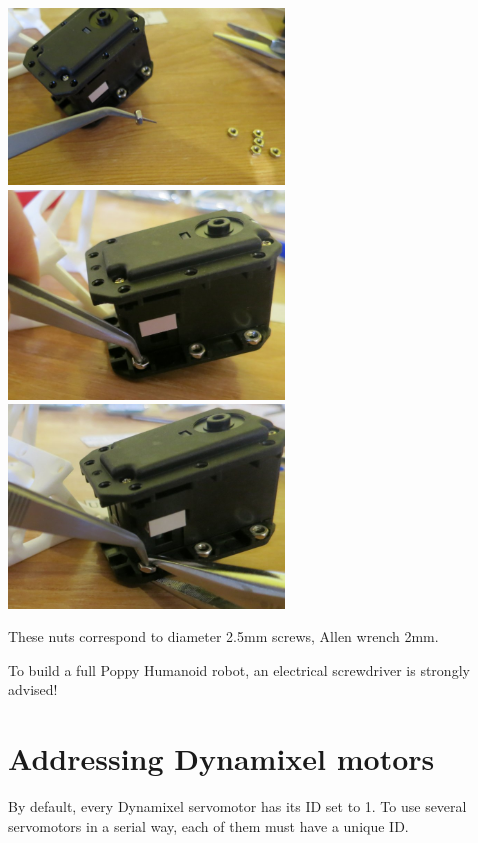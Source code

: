 \documentclass{article}
\begin{document}
 \begin{center}
  \includegraphics[width=0.55\textwidth]{img/nuts1}
  \includegraphics[width=0.55\textwidth]{img/nuts2}
  \includegraphics[width=0.55\textwidth]{img/nuts3}
 \end{center}
 
 These nuts correspond to diameter 2.5mm screws, Allen wrench 2mm.
 
 To build a full Poppy Humanoid robot, an electrical screwdriver is strongly advised!




\section{Addressing Dynamixel motors}
\label{addressing-poppys-motors}

By default, every Dynamixel servomotor has its ID set to 1. To use several servomotors in a serial way, each of them must have a unique ID.
\end{document}
